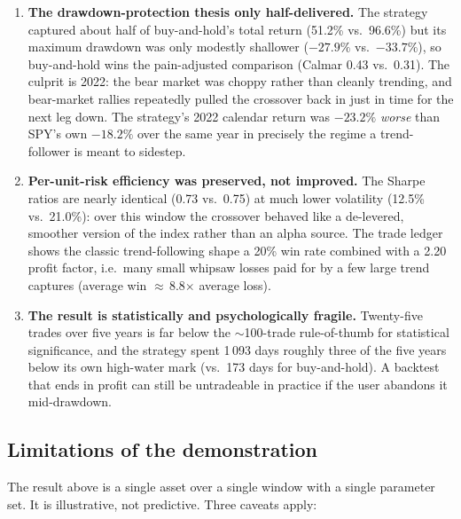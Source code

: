 \begin{enumerate}
  \item \textbf{The drawdown-protection thesis only half-delivered.} The strategy
        captured about half of buy-and-hold's total return (51.2\% vs.\ 96.6\%)
        but its maximum drawdown was only modestly shallower ($-27.9\%$ vs.\
        $-33.7\%$), so buy-and-hold wins the pain-adjusted comparison (Calmar
        0.43 vs.\ 0.31). The culprit is 2022: the bear market was choppy rather
        than cleanly trending, and bear-market rallies repeatedly pulled the
        crossover back in just in time for the next leg down. The strategy's 2022
        calendar return was $-23.2\%$ \textemdash{} \emph{worse} than SPY's own
        $-18.2\%$ over the same year \textemdash{} in precisely the regime a
        trend-follower is meant to sidestep.
  \item \textbf{Per-unit-risk efficiency was preserved, not improved.} The Sharpe
        ratios are nearly identical (0.73 vs.\ 0.75) at much lower volatility
        (12.5\% vs.\ 21.0\%): over this window the crossover behaved like a
        de-levered, smoother version of the index rather than an alpha source.
        The trade ledger shows the classic trend-following shape \textemdash{} a
        20\% win rate combined with a 2.20 profit factor, i.e.\ many small
        whipsaw losses paid for by a few large trend captures (average win
        $\approx$\,8.8$\times$ average loss).
  \item \textbf{The result is statistically and psychologically fragile.}
        Twenty-five trades over five years is far below the $\sim$100-trade
        rule-of-thumb for statistical significance, and the strategy spent
        1\,093 days \textemdash{} roughly three of the five years \textemdash{}
        below its own high-water mark (vs.\ 173 days for buy-and-hold). A
        backtest that ends in profit can still be untradeable in practice if the
        user abandons it mid-drawdown.
\end{enumerate}

\subsection{Limitations of the demonstration}

The result above is a single asset over a single window with a single parameter
set. It is illustrative, not predictive. Three caveats apply:

